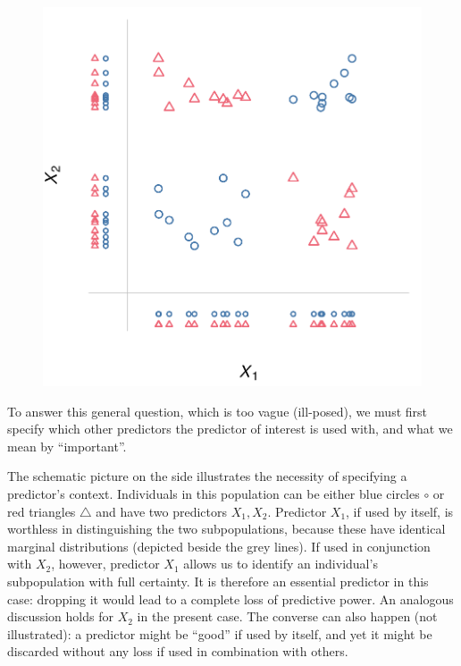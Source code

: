 \documentclass[utf8]{FrontiersinHarvard} %
\renewcommand*{\|}[1][]{\nonscript\:#1\vert\nonscript\:\mathopen{}}
\begin{document}
\setlength{\intextsep}{0ex}%
\setlength{\columnsep}{1ex}%
\begin{figure}%
\vspace{-1ex}%
\includegraphics[width=\linewidth]{example_importance_context3.pdf}%
\end{figure}%
To answer this general question, which is too vague (ill-posed), we must first specify which other predictors the predictor of interest is used with, and what we mean by \enquote{important}.

The schematic picture on the side illustrates the necessity of specifying a predictor's context. Individuals in this population can be either \textcolor{bluepurple}{blue circles $\circ$} or \textcolor{redpurple}{red triangles $\triangle$} and have two predictors $X_{1}, X_{2}$. Predictor $X_{1}$, if used by itself, is worthless in distinguishing the two subpopulations, because these have identical marginal distributions (depicted beside the grey lines). If used in conjunction with $X_{2}$, however, predictor $X_{1}$ allows us to identify an individual's subpopulation with full certainty. It is therefore an essential predictor in this case: dropping it would lead to a complete loss of predictive power. An analogous discussion holds for $X_{2}$ in the present case. The converse can also happen (not illustrated): a predictor might be \enquote{good} if used by itself, and yet it might be discarded without any loss if used in combination with others.
\end{document}
